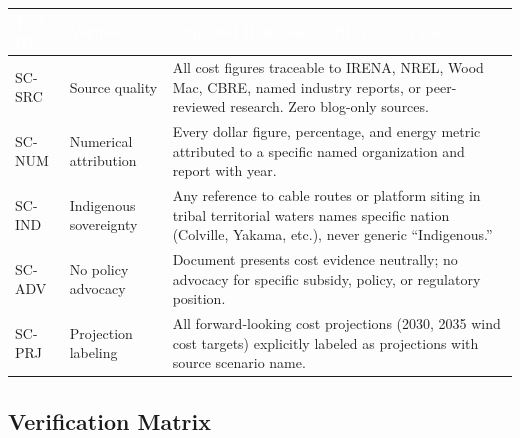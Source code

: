 \documentclass[11pt,letterpaper]{article}
\newcommand{\tableheader}[1]{\textbf{\sffamily\textcolor{white}{#1}}}
\begin{document}
\begin{center}
\begin{tabularx}{\textwidth}{C{1.5cm}L{4cm}X}
\toprule
{}
\tableheader{Test ID} & \tableheader{Verifies} & \tableheader{Expected Behavior --- BLOCK on Fail} \\
\midrule
SC-SRC & Source quality & All cost figures traceable to IRENA, NREL, Wood Mac, CBRE, named industry reports, or peer-reviewed research. Zero blog-only sources. \\
SC-NUM & Numerical attribution & Every dollar figure, percentage, and energy metric attributed to a specific named organization and report with year. \\
SC-IND & Indigenous sovereignty & Any reference to cable routes or platform siting in tribal territorial waters names specific nation (Colville, Yakama, etc.), never generic ``Indigenous.'' \\
SC-ADV & No policy advocacy & Document presents cost evidence neutrally; no advocacy for specific subsidy, policy, or regulatory position. \\
SC-PRJ & Projection labeling & All forward-looking cost projections (2030, 2035 wind cost targets) explicitly labeled as projections with source scenario name. \\
\bottomrule
\end{tabularx}
\end{center}

\subsection{Verification Matrix}
\end{document}
